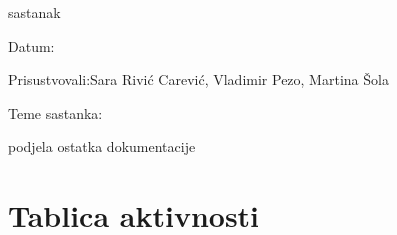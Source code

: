 \begin{packed_enum}
            \item  sastanak
			\item[] \begin{packed_item}
				\item Datum: 
				\item Prisustvovali:Sara Rivić Carević, Vladimir Pezo, Martina Šola
				\item Teme sastanka:
				\begin{packed_item}
				    \item  podjela ostatka dokumentacije
				\end{packed_item}
			\end{packed_item}
			
			
		\end{packed_enum}
		
		\eject
		\section*{Tablica aktivnosti}

